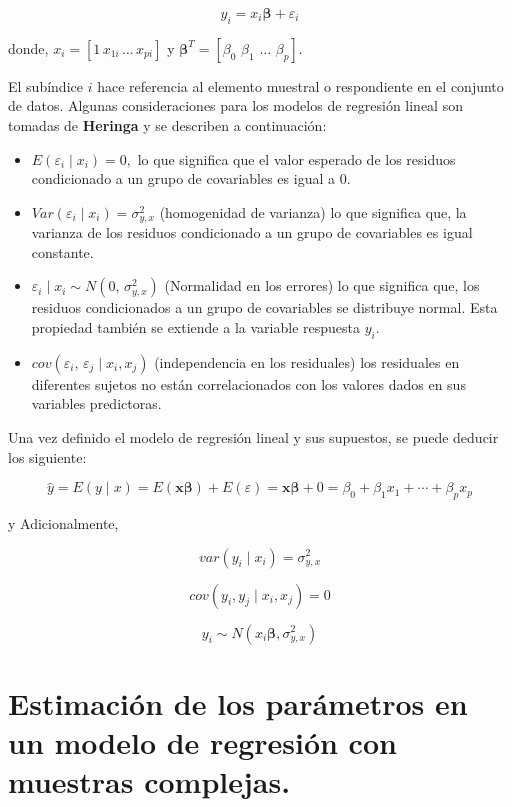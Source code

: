 \documentclass[
  12pt,
]{book}
\begin{document}
\[
y_{i}  =  x_{i}\boldsymbol{\beta}+\varepsilon_{i}
\]

donde, \(x_{i}=\left[1\,x_{1i}\,\ldots\,x_{pi}\right]\) y \(\boldsymbol{\beta}^{T}=\left[\beta_{0}\,\,\beta_{1}\,\,\ldots\,\,\beta_{p}\right]\).

El subíndice \(i\) hace referencia al elemento muestral o respondiente
en el conjunto de datos. Algunas consideraciones para los modelos de regresión lineal son tomadas de \textbf{Heringa} y se describen a continuación:

\begin{itemize}
\item
  \(E\left(\varepsilon_{i}\mid x_{i}\right)=0,\) lo que significa que
  el valor esperado de los residuos condicionado a un grupo de covariables
  es igual a 0.
\item
  \(Var\left(\varepsilon_{i}\mid x_{i}\right)=\sigma_{y,x}^{2}\) (homogenidad
  de varianza) lo que significa que, la varianza de los residuos condicionado
  a un grupo de covariables es igual constante.
\item
  \(\varepsilon_{i}\mid x_{i}\sim N\left(0,\,\sigma_{y,x}^{2}\right)\)
  (Normalidad en los errores) lo que significa que, los residuos condicionados
  a un grupo de covariables se distribuye normal. Esta propiedad también
  se extiende a la variable respuesta \(y_{i}\).
\item
  \(cov\left(\varepsilon_{i},\,\varepsilon_{j}\mid x_{i},x_{j}\right)\)
  (independencia en los residuales) los residuales en diferentes sujetos
  no están correlacionados con los valores dados en sus variables predictoras.
\end{itemize}

Una vez definido el modelo de regresión lineal y sus supuestos, se puede deducir los siguiente:

\[
\hat{y}  =  E\left(y\mid x\right)
 =  E\left(\boldsymbol{x}\boldsymbol{\beta}\right)+E\left(\varepsilon\right)
=  \boldsymbol{x}\boldsymbol{\beta}+0
  =  \beta_{0}+\beta_{1}x_{1}+\cdots+\beta_{p}x_{p}
\]

y Adicionalmente,

\[
var\left(y_{i}\mid x_{i}\right)  =  \sigma_{y,x}^{2}
\]

\[
cov\left(y_{i},y_{j}\mid x_{i},x_{j}\right)  = 0
\]

\[
y_{i}  \sim  N\left(x_{i}\boldsymbol{\beta},\sigma_{y,x}^{2}\right)
\]

\hypertarget{estimaciuxf3n-de-los-paruxe1metros-en-un-modelo-de-regresiuxf3n-con-muestras-complejas.}{%
\section{Estimación de los parámetros en un modelo de regresión con muestras complejas.}\label{estimaciuxf3n-de-los-paruxe1metros-en-un-modelo-de-regresiuxf3n-con-muestras-complejas.}}
\end{document}
